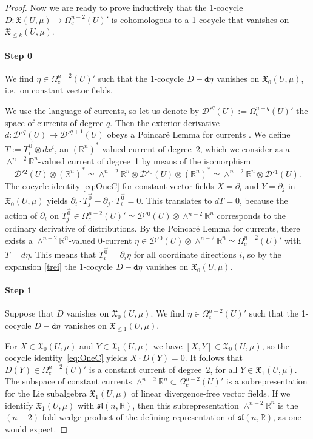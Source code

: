 \documentclass{article}
\newcommand{\fX}{\mathfrak{X}}
\newcommand{\R}{\mathbb{R}}
\newcommand{\cD}{\mathcal{D}}
\newcommand{\dd}{{\tt d}}
\theoremstyle{definition}
\begin{document}
\begin{proof}
Now we are ready to prove inductively that the 1-cocycle $D: \fX(U, \mu) \to\Omega_c^{n-2}(U)'$ is cohomologous to a 1-cocycle that vanishes on $\fX_{\leq k}(U,\mu)$. 

\paragraph{Step 0}
We find $\eta\in\Omega^{n-2}_{c}(U)'$ such that  the 1-cocycle $D-\dd \eta$ vanishes on $\fX_{0}(U, \mu)$, i.e.~on constant vector fields.

We use the language of currents, so let us denote by $\cD'^{q}(U) := \Omega^{n-q}_{c}(U)'$ the space of currents of degree $q$.
Then the exterior derivative  $d:\cD'^{q}(U) \to \cD'^{q+1}(U) $ obeys a Poincar\'e Lemma for currents \cite[Section I.2]{Demailly07}.
We define $T:= T^{\vec{0}}_{i}\otimes dx^{i}$, an $(\R^n)^*$-valued current of degree~2,
which we consider as a $\wedge^{n-2}\R^n$-valued current of degree~1 by means of the 
isomorphism 
\[
\cD'{^2}(U)\otimes (\R^n)^*
\simeq
\wedge^{n-2}\R^n \otimes \cD'{}^{0}(U) \otimes (\R^n)^*
\simeq 
\wedge^{n-2}\R^n \otimes \cD'{}^{1}(U).
\]
The cocycle identity \eqref{eq:OneC}
for constant vector fields  $X = \partial_{i}$ and $Y = \partial_{j}$ in $ \fX_{0}(U, \mu)$ yields 
$\partial_{i} \cdot T^{\vec{0}}_{j} - \partial_{j}\cdot T^{\vec{0}}_{i} = 0$.
This translates to $d T= 0$, because the action of $\partial_{i}$ on $T^{\vec{0}}_{j} \in\Omega^{n-2}_{c}(U)'\simeq \cD'{}^{0}(U) \otimes \wedge^{n-2}\R^n$ corresponds to the  ordinary derivative of distributions.
By the Poincar\'e Lemma for currents, there exists a $\wedge^{n-2}\R^n$-valued $0$-current
$\eta \in \cD'{}^{0}(U) \otimes \wedge^{n-2}\R^n \simeq \Omega^{n-2}_{c}(U)'$ with 
$T= d\eta$. This means that $T^{\vec{0}}_{i} = \partial_{i}\eta$ for all coordinate directions $i$,
so by the expansion \eqref{trei} the 1-cocycle $D - \dd \eta$ vanishes on $\fX_{0}(U, \mu)$.


\paragraph{Step 1}
Suppose that $D$ vanishes on $\fX_{0}(U,\mu)$. We find $\eta\in\Omega^{n-2}_{c}(U)'$ such that  the 1-cocycle $D-\dd \eta$ vanishes 
on $\fX_{\leq 1}(U, \mu)$.

For $X \in \fX_{0}(U,\mu)$ and 
$Y \in \fX_{1}(U, \mu)$ we have $[X,Y] \in \fX_{0}(U,\mu)$, so
the cocycle identity~\eqref{eq:OneC} yields $X \cdot D(Y) = 0$. It follows that 
$D(Y)\in\Omega^{n-2}_{c}(U)'$ is a constant current of degree~2, for all $Y \in \fX_{1}(U, \mu)$. 
The subspace of constant currents $\wedge^{n-2}\R^n \subset \Omega^{n-2}_{c}(U)'$
is a subrepresentation for the Lie subalgebra $\fX_{1}(U, \mu)$ of linear divergence-free vector fields.
If we identify $\fX_{1}(U, \mu)$ with $\mathfrak{sl}(n,\R)$, then this subrepresentation
$\wedge^{n-2}\R^n$ is the $(n-2)$-fold wedge product of the defining representation of $\mathfrak{sl}(n,\R)$, as one would expect. 


\end{proof}
\end{document}
